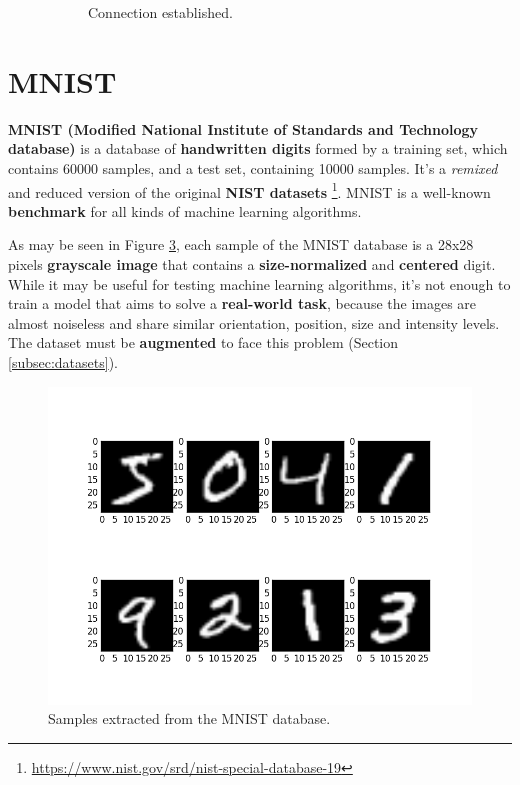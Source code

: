 \begin{figure}
\begin{subfigure}{0.33\textwidth}
		\caption{Connection established.}
		\label{fig:droidpost}
	\end{subfigure}
	\caption[DroidCam usage.]{}
	\label{fig:droidcam}
\end{figure}
	
\section{MNIST}\label{sec:MNIST}
\textbf{MNIST (Modified National Institute of Standards and Technology database)} \cite{lecun-mnisthandwrittendigit-2010} is a database of \textbf{handwritten digits} formed by a training set, which contains 60000 samples, and a test set, containing 10000 samples. It's a \textit{remixed} and reduced version of the original \textbf{NIST datasets} \footnote{\url{https://www.nist.gov/srd/nist-special-database-19}}. MNIST is a well-known \textbf{benchmark} for all kinds of machine learning algorithms.

As may be seen in Figure \ref{fig:mnist}, each sample of the MNIST database is a 28x28 pixels \textbf{grayscale image} that contains a \textbf{size-normalized} and \textbf{centered} digit. While it may be useful for testing machine learning algorithms, it's not enough to train a model that aims to solve a \textbf{real-world task}, because the images are almost noiseless and share similar orientation, position, size and intensity levels. The dataset must be \textbf{augmented} to face this problem (Section \ref{subsec:datasets}).
\begin{figure}
	\centering
	\includegraphics[width=12cm, keepaspectratio]{figures/mnist.png}
	\caption{Samples extracted from the MNIST database.}
	\label{fig:mnist}
\end{figure}

